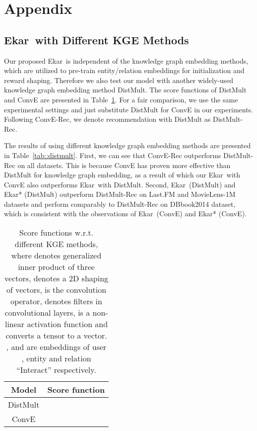 \documentclass{article}
\newcommand{\name}{Ekar}
\begin{document}
 


\newpage
\appendix
\section{Appendix}
\subsection{\name\ with Different KGE Methods}\label{sec::distmult}



Our proposed \name\ is independent of the knowledge graph embedding methods, which are utilized to pre-train entity/relation embeddings for initialization and reward shaping.
Therefore we also test our model with another widely-used knowledge graph embedding method DistMult. The score functions of DistMult and ConvE are presented in Table~\ref{tab::score_func}. For a fair comparison, we use the same experimental settings and just substitute DistMult for ConvE in our experiments. Following ConvE-Rec, we denote recommendation with DistMult as DistMult-Rec.


The results of using different knowledge graph embedding methods are presented in Table~\ref{tab::distmult}. First, we can see that ConvE-Rec outperforms DistMult-Rec on all datasets. This is because ConvE has proven more effective than DistMult for knowledge graph embedding, as a result of which our \name\ with ConvE also outperforms \name\ with DistMult. Second, \name\ (DistMult) and \name* (DistMult) outperform DistMult-Rec on Last.FM and MovieLens-1M datasets and perform comparably to DistMult-Rec on DBbook2014 dataset, which is consistent with the observations of \name\ (ConvE) and \name* (ConvE). 



\begin{table}[ht]
    \centering
    \begin{tabular}{cc}
    \toprule
        Model & Score function   \\
        \midrule
        DistMult &  \\
        ConvE &  \\
    \bottomrule
    \end{tabular}
    \caption{Score functions w.r.t. different KGE methods, where  denotes generalized inner product of three vectors,  denotes a 2D shaping of vectors,  is the convolution operator,  denotes filters in convolutional layers,  is a non-linear activation function and \cdot converts a tensor to a vector. ,  and  are embeddings of user , entity  and relation ``Interact'' respectively.}
    \label{tab::score_func}
\end{table}
\end{document}
